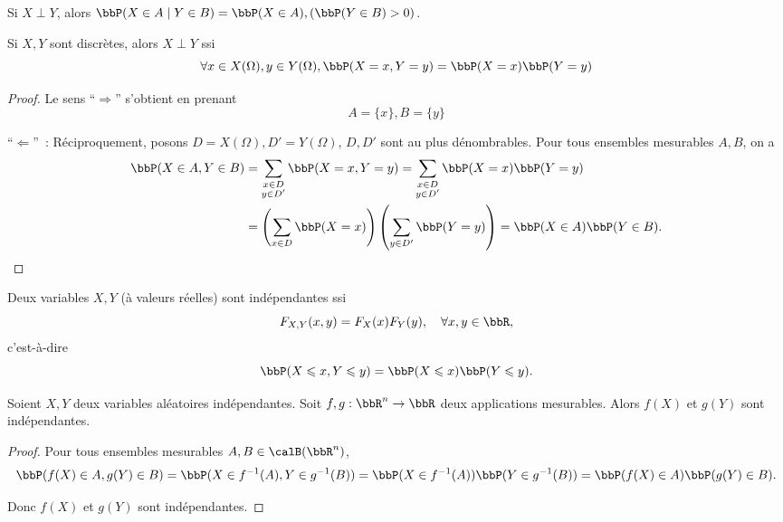 \begin{rqq}[Conséquence]
    Si $X \perp Y$, alors $\bbP(X \in A \mid Y \in B) = \bbP(X \in A), (\bbP(Y \in B) > 0)$.
\end{rqq}

\begin{prop}
    Si $X, Y$ sont discrètes, alors $X \perp Y$ ssi
    \[ \forall x \in X(\Omega), y \in Y(\Omega), \bbP(X = x, Y = y) = \bbP(X = x) \bbP(Y = y) \]
\end{prop}

\begin{proof}
    Le sens ``$\Rightarrow$'' s'obtient en prenant
    \[ A = \{ x \}, B = \{ y \} \]

    ``$\Leftarrow$''~: Réciproquement, posons $D = X(\Omega), D' = Y(\Omega)$, $D, D'$ sont au plus dénombrables.
    Pour tous ensembles mesurables $A, B$, on a
    \begin{align*}
        \bbP(X \in A, Y \in B) & = \sum_{\substack{x \in D                                                         \\ y \in D'}} \bbP(X = x, Y = y)
        = \sum_{\substack{x \in D                                                                                  \\ y \in D'}} \bbP(X = x) \bbP(Y = y) \\
                               & = \left(\sum_{x \in D} \bbP(X = x)\right)\left(\sum_{y \in D'} \bbP(Y = y)\right)
        = \bbP(X \in A) \bbP(Y \in B).
    \end{align*}
\end{proof}

\begin{prop}
    Deux variables $X, Y$ (à valeurs réelles) sont indépendantes ssi
    \[ F_{X, Y}(x, y) = F_X(x) F_Y(y), \quad \forall x, y \in \bbR, \]
    c'est-à-dire
    \[ \bbP(X \leqslant x, Y \leqslant y) = \bbP(X \leqslant x) \bbP(Y \leqslant y). \]
\end{prop}

\begin{prop}
    Soient $X, Y$ deux variables aléatoires indépendantes.
    Soit $f, g: \bbR^n \to \bbR$ deux applications mesurables.
    Alors $f(X)$ et $g(Y)$ sont indépendantes.
\end{prop}

\begin{proof}
    Pour tous ensembles mesurables $A, B \in \calB(\bbR^n)$,
    \[ \bbP(f(X) \in A, g(Y) \in B) = \bbP(X \in f^{-1}(A), Y \in g^{-1}(B))
        = \bbP(X \in f^{-1}(A)) \bbP(Y \in g^{-1}(B)) = \bbP(f(X) \in A) \bbP(g(Y) \in B). \]

    Donc $f(X)$ et $g(Y)$ sont indépendantes.
\end{proof}

